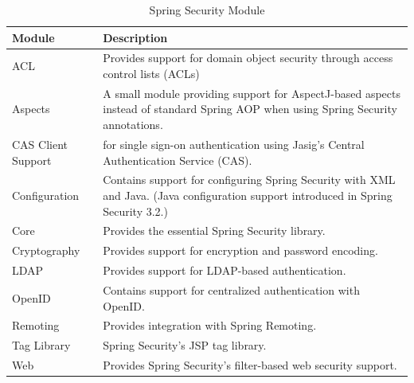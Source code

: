 \begin{table}[hbt]
 \caption{Spring Security Module}
  \begin{tabular}{lp{11cm}}
    \toprule 
    \textbf{Module} & \textbf{Description} \\
    \hline
    ACL & Provides support for domain object security through access control lists (ACLs) \\
    Aspects & A small module providing support for AspectJ-based aspects instead of standard
	Spring AOP when using Spring Security annotations. \\
	CAS Client Support & for single sign-on authentication using Jasig’s Central Authentication
	Service (CAS). \\
	Configuration & Contains support for configuring Spring Security with XML and Java. 
	(Java configuration support introduced in Spring Security 3.2.) \\
	Core & Provides the essential Spring Security library. \\
	Cryptography & Provides support for encryption and password encoding. \\
	LDAP & Provides support for LDAP-based authentication. \\
	OpenID & Contains support for centralized authentication with OpenID. \\
	Remoting & Provides integration with Spring Remoting. \\
	Tag Library & Spring Security’s JSP tag library. \\
	Web & Provides Spring Security’s filter-based web security support. \\
	\bottomrule
  \end{tabular}
\end{table}

